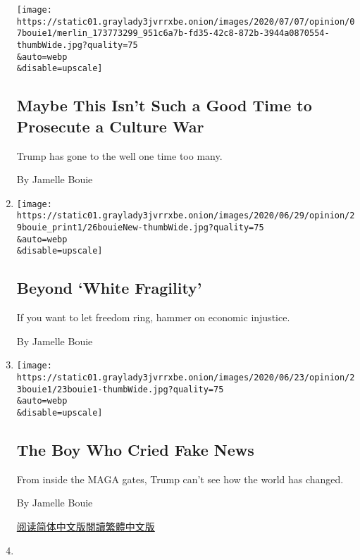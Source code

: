 \begin{enumerate}
  \texttt{[image: https://static01.graylady3jvrrxbe.onion/images/2020/07/07/opinion/07bouie1/merlin\_173773299\_951c6a7b-fd35-42c8-872b-3944a0870554-thumbWide.jpg?quality=75\\\&auto=webp\\\&disable=upscale]}

  \hypertarget{maybe-this-isnt-such-a-good-time-to-prosecute-a-culture-war}{%
  \subsection{Maybe This Isn't Such a Good Time to Prosecute a Culture
  War}\label{maybe-this-isnt-such-a-good-time-to-prosecute-a-culture-war}}

  Trump has gone to the well one time too many.

  By Jamelle Bouie
\item
  \href{/2020/06/26/opinion/black-lives-matter-injustice.html}{}

  \texttt{[image: https://static01.graylady3jvrrxbe.onion/images/2020/06/29/opinion/29bouie\_print1/26bouieNew-thumbWide.jpg?quality=75\\\&auto=webp\\\&disable=upscale]}

  \hypertarget{beyond-white-fragility}{%
  \subsection{Beyond `White Fragility'}\label{beyond-white-fragility}}

  If you want to let freedom ring, hammer on economic injustice.

  By Jamelle Bouie
\item
  \href{/2020/06/23/opinion/maga-trump-fake-news.html}{}

  \texttt{[image: https://static01.graylady3jvrrxbe.onion/images/2020/06/23/opinion/23bouie1/23bouie1-thumbWide.jpg?quality=75\\\&auto=webp\\\&disable=upscale]}

  \hypertarget{the-boy-who-cried-fake-news}{%
  \subsection{The Boy Who Cried Fake
  News}\label{the-boy-who-cried-fake-news}}

  From inside the MAGA gates, Trump can't see how the world has changed.

  By Jamelle Bouie

  \href{https://cn.nytimes3xbfgragh.onion/opinion/20200624/maga-trump-fake-news/}{阅读简体中文版}\href{https://cn.nytimes3xbfgragh.onion/opinion/20200624/maga-trump-fake-news/zh-hant/}{閱讀繁體中文版}
\item
  \href{/2020/06/18/opinion/juneteenth-slavery-freedom.html}{}


\end{enumerate}
